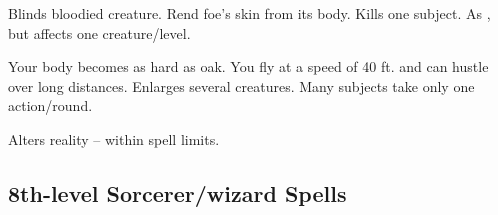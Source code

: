 \begin{swspelllist}
 Blinds bloodied creature.
 Rend foe's skin from its body.
 Kills one subject.
 As , but affects one creature/level.

 Your body becomes as hard as oak.
 You fly at a speed of 40 ft. and can hustle over long distances.
 Enlarges several creatures.
 Many subjects take only one action/round.

\M Alters reality -- within spell limits.
\end{swspelllist}

\subsection{8th-level Sorcerer/wizard Spells} 
